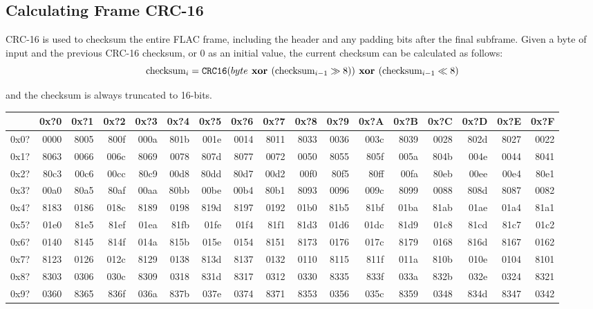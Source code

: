 \subsection{Calculating Frame CRC-16}
\label{flac:verify_crc16}
CRC-16 is used to checksum the entire FLAC frame, including the header
and any padding bits after the final subframe.
Given a byte of input and the previous CRC-16 checksum,
or 0 as an initial value, the current checksum can be calculated as follows:
\begin{equation}
\text{checksum}_i = \texttt{CRC16}(byte\textbf{ xor }(\text{checksum}_{i - 1} \gg 8 ))\textbf{ xor }(\text{checksum}_{i - 1} \ll 8)
\end{equation}
\par
\noindent
and the checksum is always truncated to 16-bits.
\begin{table}[h]
{\ttfamily
\begin{tabular}{|r||r|r|r|r|r|r|r|r|r|r|r|r|r|r|r|r|}
\hline
 & 0x?0 & 0x?1 & 0x?2 & 0x?3 & 0x?4 & 0x?5 & 0x?6 & 0x?7 & 0x?8 & 0x?9 & 0x?A & 0x?B & 0x?C & 0x?D & 0x?E & 0x?F \\
\hline
0x0? & 0000 & 8005 & 800f & 000a & 801b & 001e & 0014 & 8011 & 8033 & 0036 & 003c & 8039 & 0028 & 802d & 8027 & 0022 \\
0x1? & 8063 & 0066 & 006c & 8069 & 0078 & 807d & 8077 & 0072 & 0050 & 8055 & 805f & 005a & 804b & 004e & 0044 & 8041 \\
0x2? & 80c3 & 00c6 & 00cc & 80c9 & 00d8 & 80dd & 80d7 & 00d2 & 00f0 & 80f5 & 80ff & 00fa & 80eb & 00ee & 00e4 & 80e1 \\
0x3? & 00a0 & 80a5 & 80af & 00aa & 80bb & 00be & 00b4 & 80b1 & 8093 & 0096 & 009c & 8099 & 0088 & 808d & 8087 & 0082 \\
0x4? & 8183 & 0186 & 018c & 8189 & 0198 & 819d & 8197 & 0192 & 01b0 & 81b5 & 81bf & 01ba & 81ab & 01ae & 01a4 & 81a1 \\
0x5? & 01e0 & 81e5 & 81ef & 01ea & 81fb & 01fe & 01f4 & 81f1 & 81d3 & 01d6 & 01dc & 81d9 & 01c8 & 81cd & 81c7 & 01c2 \\
0x6? & 0140 & 8145 & 814f & 014a & 815b & 015e & 0154 & 8151 & 8173 & 0176 & 017c & 8179 & 0168 & 816d & 8167 & 0162 \\
0x7? & 8123 & 0126 & 012c & 8129 & 0138 & 813d & 8137 & 0132 & 0110 & 8115 & 811f & 011a & 810b & 010e & 0104 & 8101 \\
0x8? & 8303 & 0306 & 030c & 8309 & 0318 & 831d & 8317 & 0312 & 0330 & 8335 & 833f & 033a & 832b & 032e & 0324 & 8321 \\
0x9? & 0360 & 8365 & 836f & 036a & 837b & 037e & 0374 & 8371 & 8353 & 0356 & 035c & 8359 & 0348 & 834d & 8347 & 0342 \\

\end{tabular}}
\end{table}
